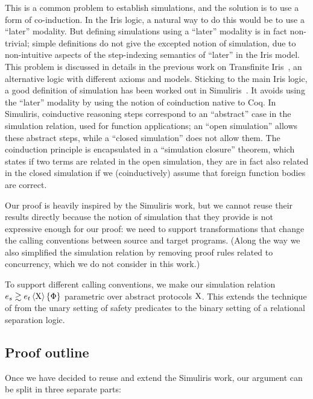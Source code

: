 This is a common problem to establish simulations, and the solution is to use a form of co-induction.
%
In the Iris logic, a natural way to do this would be to use a ``later'' modality.
%
But defining simulations using a ``later'' modality is in fact non-trivial; simple definitions do not give the excepted notion of simulation, due to non-intuitive aspects of the step-indexing semantics of ``later'' in the Iris model. This problem is discussed in details in the previous work on Transfinite Iris~\citep*{TODO-transfinite-Iris}, an alternative logic with different axioms and models.
%
Sticking to the main Iris logic, a good definition of simulation has been worked out in Simuliris~\citep*{TODO-Simuliris}.
%
It avoids using the ``later'' modality by using the notion of coinduction native to Coq. In Simuliris, coinductive reasoning steps correspond to an ``abstract'' case in the simulation relation, used for function applications; an ``open simulation'' allows these abstract steps, while a ``closed simulation'' does not allow them.
%
The coinduction principle is encapsulated in a ``simulation closure'' theorem, which states if two terms are related in the open simulation, they are in fact also related in the closed simulation if we (coinductively) assume that foreign function bodies are correct.

Our proof is heavily inspired by the Simuliris work, but we cannot reuse their results directly because the notion of simulation that they provide is not expressive enough for our proof: we need to support transformations that change the calling conventions between source and target programs.
%
(Along the way we also simplified the simulation relation by removing proof rules related to concurrency, which we do not consider in this work.)

To support different calling conventions, we make our simulation relation $\iSim[\Chi]{\Phi}{e_s}{e_t}$ parametric over abstract protocols $\mathrm{X}$. This extends the technique of \citet*{TODO-paulo} from the unary setting of safety predicates to the binary setting of a relational separation logic.

\subsection{Proof outline}

Once we have decided to reuse and extend the Simuliris work, our argument can be split in three separate parts:

